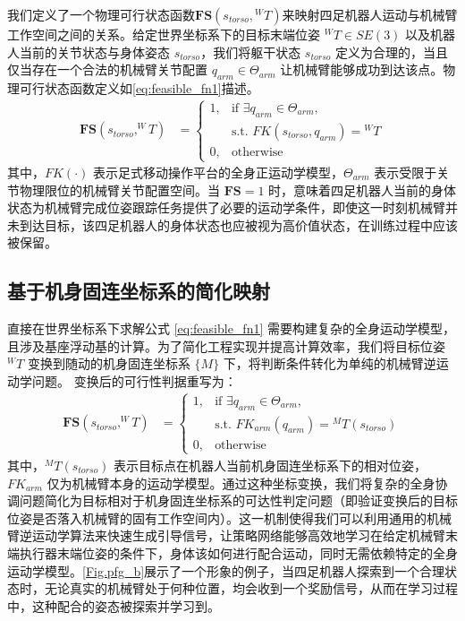 我们定义了一个物理可行状态函数$\boldsymbol{FS}(s_{torso}, {^WT})$来映射四足机器人运动与机械臂工作空间之间的关系。给定世界坐标系下的目标末端位姿 ${^WT} \in SE(3)$ 以及机器人当前的关节状态与身体姿态 $s_{torso}$，我们将躯干状态 $s_{torso}$ 定义为合理的，当且仅当存在一个合法的机械臂关节配置 $q_{arm} \in \Theta_{arm}$ 让机械臂能够成功到达该点。物理可行状态函数定义如\autoref{eq:feasible_fn1}描述。
\begin{align}
    \label{eq:feasible_fn1}
    \boldsymbol{FS}(s_{torso}, ^WT) & = \begin{cases}
                                            1, & \text{if } \exists q_{arm}\in\Theta_{arm}, \\
                                               & \text{s.t. } FK(s_{torso},q_{arm}) = {^WT} \\
                                            0, & \text{otherwise}
                                        \end{cases}
\end{align}
其中，$FK(\cdot)$ 表示足式移动操作平台的全身正运动学模型，$\Theta_{arm}$ 表示受限于关节物理限位的机械臂关节配置空间。当 $\boldsymbol{FS} = 1$ 时，意味着四足机器人当前的身体状态为机械臂完成位姿跟踪任务提供了必要的运动学条件，即使这一时刻机械臂并未到达目标，该四足机器人的身体状态也应被视为高价值状态，在训练过程中应该被保留。

\subsection{基于机身固连坐标系的简化映射}
直接在世界坐标系下求解公式 \eqref{eq:feasible_fn1} 需要构建复杂的全身运动学模型，且涉及基座浮动基的计算。为了简化工程实现并提高计算效率，我们将目标位姿 ${^WT}$ 变换到随动的机身固连坐标系 $\{M\}$ 下，将判断条件转化为单纯的机械臂逆运动学问题。
变换后的可行性判据重写为：
\begin{align}
    \label{eq:feasible_fn2}
    \boldsymbol{FS}(s_{torso}, ^WT) & = \begin{cases}
                                            1, & \text{if } \exists q_{arm}\in\Theta_{arm},        \\
                                               & \text{s.t. } FK_{arm}(q_{arm}) = {^MT}(s_{torso}) \\
                                            0, & \text{otherwise}
                                        \end{cases}
\end{align}
其中，${^MT}(s_{torso})$ 表示目标点在机器人当前机身固连坐标系下的相对位姿，$FK_{arm}$ 仅为机械臂本身的运动学模型。通过这种坐标变换，我们将复杂的全身协调问题简化为目标相对于机身固连坐标系的可达性判定问题（即验证变换后的目标位姿是否落入机械臂的固有工作空间内）。这一机制使得我们可以利用通用的机械臂逆运动学算法来快速生成引导信号，让策略网络能够高效地学习在给定机械臂末端执行器末端位姿的条件下，身体该如何进行配合运动，同时无需依赖特定的全身运动学模型。\autoref{Fig.pfg_b}展示了一个形象的例子，当四足机器人探索到一个合理状态时，无论真实的机械臂处于何种位置，均会收到一个奖励信号，从而在学习过程中，这种配合的姿态被探索并学习到。

